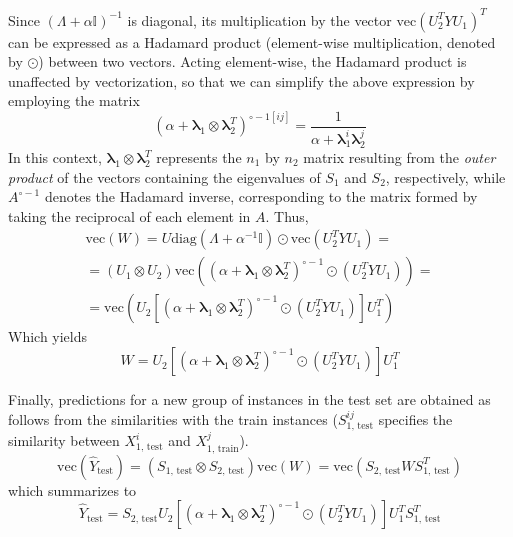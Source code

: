 \documentclass[sn-mathphys-num]{sn-jnl}%
\newcommand{\T}{^T}
\theoremstyle{thmstyleone}%
\theoremstyle{thmstyletwo}%
\theoremstyle{thmstylethree}%
\begin{document}
\begin{appendices}
%
Since $(\Lambda + \alpha\mathbb{I})^{-1}$ is diagonal, its multiplication by the vector $\text{vec}(U_2\T Y U_1)\T$ can be expressed as a Hadamard product (element-wise multiplication, denoted by $\odot$) between two vectors. Acting element-wise, the Hadamard product is unaffected by vectorization, so that we can simplify the above expression by employing the matrix
%
\begin{equation}
    (\alpha + \mathbf{\lambda}_1 \otimes \mathbf{\lambda}_2\T)^{\circ -1[ij]}
    = \frac{1}{\alpha + \mathbf{\lambda}_1^{i} \mathbf{\lambda}_2^{j}}
\end{equation}
%
In this context, $\mathbf{\lambda}_1 \otimes \mathbf{\lambda}_2\T$ represents the $n_1$ by $n_2$ matrix resulting from the \emph{outer product} of the vectors containing the eigenvalues of $S_1$ and $S_2$, respectively, while $A^{\circ -1}$ denotes the Hadamard inverse, corresponding to the matrix formed by taking the reciprocal of each element in $A$. Thus,
%
\begin{multline*}
    \text{vec}(W)
    = U \text{diag}(\Lambda + \alpha^{-1}\mathbb{I}) \odot \text{vec}(U_2\T Y U_1)
    =\\
    = (U_1 \otimes U_2) \text{vec}(
        (\alpha + \mathbf{\lambda}_1 \otimes \mathbf{\lambda}_2\T)^{\circ -1}
        \odot (U_2\T Y U_1)
    )
    =\\
    = \text{vec}(
        U_2
        [
            (\alpha + \mathbf{\lambda}_1 \otimes \mathbf{\lambda}_2\T)^{\circ -1}
            \odot (U_2\T Y U_1)
        ]
        U_1\T
    )
\end{multline*}
%
Which yields
%
\begin{equation}
    W = 
        U_2
        [
            (\alpha + \mathbf{\lambda}_1 \otimes \mathbf{\lambda}_2\T)^{\circ -1}
            \odot (U_2\T Y U_1)
        ]
        U_1\T
\end{equation}

Finally, predictions for a new group of instances in the test set are obtained as follows from the similarities with the train instances ($S_\text{1, test}^{ij}$ specifies the similarity between $X_\text{1, test}^{i}$ and $X_\text{1, train}^{j}$).
%
\begin{equation}
    \text{vec}(\hat Y_\text{test})
    = (S_\text{1, test} \otimes S_\text{2, test}) \text{vec}(W)
    = \text{vec}(S_\text{2, test} W S_\text{1, test}\T)
\end{equation}
%
which summarizes to
%
\begin{equation}
    \hat Y_\text{test} =
        S_\text{2, test}
        U_2
        [
            (\alpha + \mathbf{\lambda}_1 \otimes \mathbf{\lambda}_2\T)^{\circ -1}
            \odot (U_2\T Y U_1)
        ]
        U_1\T
        S_\text{1, test}\T
\end{equation}


\end{appendices}
\end{document}
